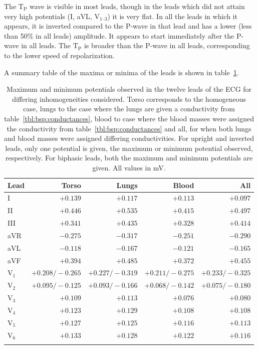 The $\text{T}_{\text{P}}$ wave is visible in
most leads, though in the leads which did not attain very high potentials (I,
aVL, $\text{V}_{\text{1--3}}$) it is very flat.
In all the leads in which it appears, it is inverted compared to the P-wave in
that lead and has a lower (less than 50\% in all leads) amplitude.
It appears to start immediately after the P-wave in all leads.
The $\text{T}_{\text{P}}$ is broader than the P-wave in all leads, corresponding
to the lower speed of repolarization.

A summary table of the maxima or minima of the leads is shown in
table~\ref{tbl:bsp:ecg}.


\begin{table}
    \caption[Maximum and minimum potentials observed in ECG leads]{
        Maximum and minimum potentials observed in the twelve leads of the ECG
        for differing inhomogeneities considered.
        Torso corresponds to the homogeneous case, lungs to the case where the
        lungs are given a conductivity from table~\ref{tbl:bsp:conductances},
        blood to case where the blood masses were assigned the conductivity from
        table~\ref{tbl:bsp:conductances} and all, for when both lungs and blood
        masses were assigned differing conductivities.
        For upright and inverted leads, only one potential is given, the maximum
        or minimum potential observed, respectively.
        For biphasic leads, both the maximum and minimum potentials are given.
        All values in mV.
    }
    \begin{tabular}{ l r r r r }
    \toprule
    Lead & Torso & Lungs & Blood & All \\
    \midrule
    I                       & $+0.139$ & $+0.117$ & $+0.113$ & $+0.097$ \\
    II                      & $+0.446$ & $+0.535$ & $+0.415$ & $+0.497$ \\
    III                     & $+0.341$ & $+0.435$ & $+0.328$ & $+0.414$ \\
    aVR                     & $-0.275$ & $-0.317$ & $-0.251$ & $-0.290$ \\
    aVL                     & $-0.118$ & $-0.167$ & $-0.121$ & $-0.165$ \\
    aVF                     & $+0.394$ & $+0.485$ & $+0.372$ & $+0.455$ \\
    $\text{V}_{\text{1}}$   & $+0.208/-0.265$ & $+0.227/-0.319$ & $+0.211/-0.275$ & $+0.233/-0.325$ \\
    $\text{V}_{\text{2}}$   & $+0.095/-0.125$ & $+0.093/-0.166$ & $+0.068/-0.142$ & $+0.075/-0.180$ \\
    $\text{V}_{\text{3}}$   & $+0.109$ & $+0.113$ & $+0.076$ & $+0.080$ \\
    $\text{V}_{\text{4}}$   & $+0.123$ & $+0.129$ & $+0.108$ & $+0.108$ \\
    $\text{V}_{\text{5}}$   & $+0.127$ & $+0.125$ & $+0.116$ & $+0.113$ \\
    $\text{V}_{\text{6}}$   & $+0.133$ & $+0.128$ & $+0.122$ & $+0.116$ \\
    \bottomrule
    \label{tbl:bsp:ecg}
    \end{tabular}
\end{table}

